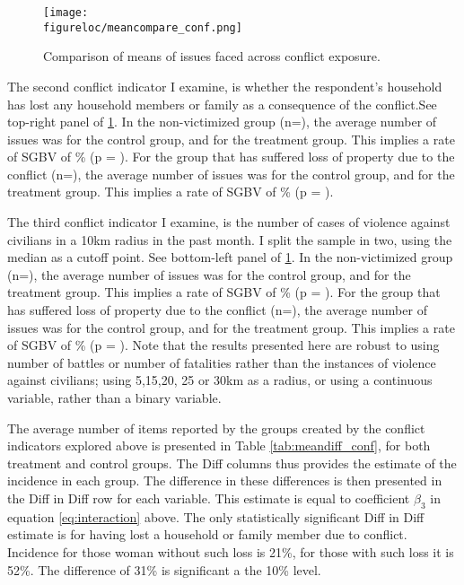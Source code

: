 \documentclass[10pt,a4paper]{scrartcl} %
\newcommand{\figureloc}{C:/Users/Koen/Dropbox/PhD/Papers/CongoGBV/Figures}
\begin{document}
\begin{figure}[htb]
  \texttt{[image: \\figureloc/meancompare\_conf.png]}
  \caption{Comparison of means of issues faced across conflict exposure.}
  \label{fig:meancompare_conf}
\end{figure}

The second conflict indicator I examine, is whether the respondent's household has lost any household members or family as a consequence of the conflict.See top-right panel of \ref{fig:meancompare_conf}. In the non-victimized group (n=), the average number of issues was  for the control group, and  for the treatment group. This implies a rate of SGBV of \% (p = ). For the group that has suffered loss of property due to the conflict (n=), the average number of issues was  for the control group, and  for the treatment group. This implies a rate of SGBV of \% (p = ).

The third conflict indicator I examine, is the number of cases of violence against civilians in a 10km radius in the past month. I split the sample in two, using the median as a cutoff point. See bottom-left panel of \ref{fig:meancompare_conf}. In the non-victimized group (n=), the average number of issues was  for the control group, and  for the treatment group. This implies a rate of SGBV of \% (p = ). For the group that has suffered loss of property due to the conflict (n=), the average number of issues was  for the control group, and  for the treatment group. This implies a rate of SGBV of \% (p = ). Note that the results presented here are robust to using number of battles or number of fatalities rather than the instances of violence against civilians; using 5,15,20, 25 or 30km as a radius, or using a continuous variable, rather than a binary variable.  

The average number of items reported by the groups created by the conflict indicators explored above is presented in Table \ref{tab:meandiff_conf}, for both treatment and control groups. The Diff columns thus provides the estimate of the incidence in each group. The difference in these differences is then presented in the Diff in Diff row for each variable. This estimate is equal to coefficient $\beta_3$ in equation \ref{eq:interaction} above. The only statistically significant Diff in Diff estimate is for having lost a household or family member due to conflict. Incidence for those woman without such loss is 21\%, for those with such loss it is 52\%. The difference of 31\% is significant a the 10\% level.
\end{document}
